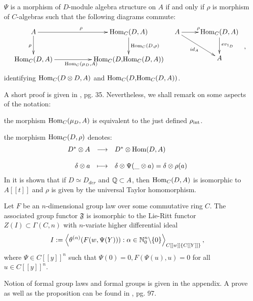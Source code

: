 \begin{lemm}
$\Psi$ is a morphism of $D$-module algebra structure on $A$ if and only if $\rho$ is morphism of $C$-algebras such that the following diagrams commute:
$$\bao{cc}
\xymatrix{
A \ar[rr]^{\rho}\ar[d]_\rho&&\trm{Hom}_C(D,A)\ar[d]^{\trm{Hom}_C(D,\rho)}\\
\trm{Hom}_C(D,A) \ar[rr]_{\trm{Hom}_C(\mu_D,A)}&&\trm{Hom}_C(D,\!\trm{Hom}_C(D,A))\\
}
&\xymatrix{
A \ar[r]^{\rho}\ar[rd]_{id_A}&\trm{Hom}_C(D,A)\ar[d]^{ev_{1_D}}\\
&A\\
}
\ea,$$
identifying $\trm{Hom}_C(D \otimes D,A)$ and $\trm{Hom}_C(D,\!\trm{Hom}_C(D,A))$.
\end{lemm}
\bmk A short proof is given in \cite{Heid10}, pg. 35. Nevertheless, we shall remark on some aspects of the notation:
\bn
\item the morphism $\trm{Hom}_C(\mu_D,A)$ is equivalent to the just defined $\rho_{\trm{int}}$.
\item the morphism $\trm{Hom}_C(D,\rho)$ denotes:
$$\bao{rcl}
D^* \otimes A &\longrightarrow& D^* \otimes \trm{Hom}(D,A)\\
&&\\
\delta \otimes a &\longmapsto& \delta \otimes \Psi(\_\otimes a) = \delta \otimes \rho(a)\\
\ea$$
\en
In \cite{Heid13} it is shown that if $D \simeq D_{der}$ and $\qz \subset A$, then $\trm{Hom}_C(D,A)$ is isomorphic to $A[[t]]$ and $\rho$ is given by the universal Taylor homomorphism.
\begin{prop}\label{GroupLaw}
Let $F$ be an $n$-dimensional group law over some commutative ring $C$. The associated group functor $\mathfrak{F}$ is isomorphic to the Lie-Ritt functor $Z(I) \subset \Gamma(C,n)$ with $n$-variate higher differential ideal
$$I := \left<\theta^{(\alpha)}(F(w,\Psi(Y))) : \alpha \in \nz_0^n\bsl\{0\}\right>_{C[[w]]\{C[[Y]]\}},$$
where $\Psi \in C[[y]]^n$ such that $\Psi(0) = 0, F(\Psi(u),u) = 0$ for all $u \in C[[y]]^n$.
\end{prop}
\bmk Notion of formal group laws and formal groups is given in the appendix. A prove as well as the proposition can be found in \cite{Heid10}, pg. 97.
\bsp \label{example_Heid_add_mul_grp_law}%
